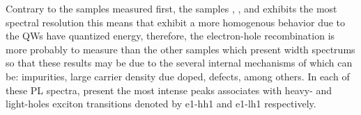 Contrary to the samples measured first, the samples , , and  exhibits the most spectral resolution this means that exhibit a more homogenous behavior  due to the QWs have quantized energy, therefore, the electron-hole recombination is more probably to measure than the other samples which present width spectrums so that these results may be due to the several internal mechanisms of which can be: impurities, large carrier density due doped,  defects, among others\cite{khmissi2010effectcarriers,kundrotas2005excitonic}. In each of these PL spectra,  present the most intense peaks associates with heavy- and light-holes exciton transitions denoted by e1-hh1 and e1-lh1 respectively.


